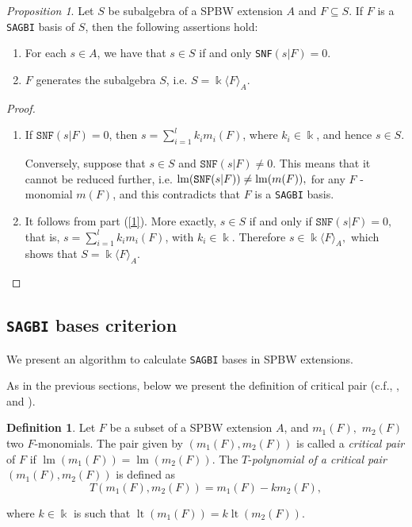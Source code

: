 \documentclass{amsart}
\theoremstyle{definition}
\newtheorem{definition}[theorem]{Definition}
\theoremstyle{remark}
\newtheorem{proposition}[theorem]{Proposition}
\numberwithin{equation}{section}
\begin{document}
\begin{proposition}\label{prop}
Let $S$ be subalgebra of a SPBW extension $A$ and $F \subseteq S$. If $F$ is a {\rm \texttt{SAGBI}} basis of $S$, then the following assertions hold:
\begin{enumerate}
\item[\rm{(1)}] \label{1} For each  $s\in A$, we have that $s \in S$ if and only {\rm \texttt{SNF}}$(s | F) = 0$.

\item[\rm{(2)}]  $F$ generates the subalgebra $S$, i.e. $S=\Bbbk\langle F\rangle_{A}$.
\end{enumerate}
\end{proposition}
\begin{proof}
\begin{enumerate}
\item[\rm{(1)}]  If $\texttt{SNF}(s | F)=0$, then $s=\sum\limits_{i=1}^{l} k_{i} m_{i}(F)$, where $k_{i} \in \Bbbk$, and hence $s \in S$.

Conversely, suppose that $s \in S$ and $\texttt{SNF}(s | F) \neq 0.$ This means that it cannot be reduced further, i.e. $\operatorname{lm}(\texttt{SNF}(s | F)) \neq {\rm lm}(m(F)),$ for any $F$ -monomial $m(F)$, and this contradicts that $F$ is a \texttt{SAGBI} basis.

\item[\rm{(2)}]  It follows from part (\ref{1}). More exactly, $s \in S$ if and only if $\texttt{SNF}(s | F)=0,$ that is, $s=\sum\limits_{i=1}^{l} k_{i} m_{i}(F)$, with $k_{i} \in \Bbbk.$ Therefore $s \in \Bbbk\langle F\rangle_{A},$ which shows that $S=\Bbbk\langle F\rangle_{A}$.
\end{enumerate}
\end{proof}


\subsection{\texttt{SAGBI} bases criterion}\label{SAGBIbasescriterionSPBW}

We present an algorithm to calculate \texttt{SAGBI} bases in SPBW extensions. 

As in the previous sections, below we present the definition of critical pair (c.f.\cite[Definition 6.6.26]{KreuzerRobbiano2005}, \cite[Definition 2]{Nordbeck2002}, and \cite[Definition 5]{Khanetal2019}).

\begin{definition}
Let $F$ be a subset of a SPBW extension $A$, and $m_1(F),$ $m_2(F)$ two $F$-monomials. The pair given by $\left(m_1(F), m_2(F)\right)$ is called a \textit{critical pair} of $F$ if $\operatorname{lm}(m_1(F))=\operatorname{lm}\left(m_2(F)\right)$. The $T$-{\em polynomial of a critical pair} $\left(m_1(F), m_2(F)\right)$ is defined as 
$$
T\left(m_1(F), m_2(F)\right)= m_1(F)-km_2(F), $$ 

where $k \in \Bbbk$ is such that $\operatorname{lt}(m_1(F)) = k\operatorname{lt}\left(m_2(F)\right).$
\end{definition}
\end{document}
